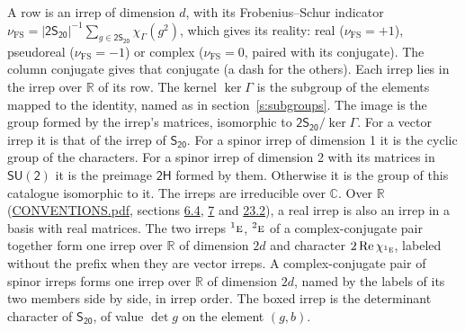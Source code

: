 \documentclass[10pt,a4paper]{article}
\numberwithin{equation}{section}
\newcommand{\grp}[1]{\mathsf{#1}}
\newcommand{\irr}[1]{\text{\normalfont\scshape #1}}
\newcommand{\conjpair}[1]{{}^{#1}}
\newcommand{\irchar}[1]{\chi_{#1}}
\newcommand{\fsind}{\nu_{\mathrm{FS}}}
\begin{document}
\leavevmode\label{n:index.frobenius}\label{n:head.irrep}\label{n:head.reality}A row is an irrep of dimension $d$, with its Frobenius--Schur indicator $\fsind = |\grp{2S_{20}}|^{-1}\allowbreak\sum_{g\in\grp{2S_{20}}}\irchar{\Gamma}(g^2)$, which gives its reality: real ($\fsind = +1$), pseudoreal ($\fsind = -1$) or complex ($\fsind = 0$, paired with its conjugate). \label{n:head.conjugate}The column conjugate gives that conjugate (a dash for the others). \label{n:head.over.real}Each irrep lies in the irrep over $\mathbb{R}$ of its row. \label{n:head.kernel}The kernel $\ker\Gamma$ is the subgroup of the elements mapped to the identity, named as in section~\ref{s:subgroups}. \label{n:head.image}The image is the group formed by the irrep's matrices, isomorphic to $\grp{2S_{20}}/\ker\Gamma$. For a vector irrep it is that of the irrep of \href{../../../rotation/data/pdf/S20.pdf}{$\grp{S_{20}}$}. For a spinor irrep of dimension 1 it is the cyclic group of the characters. For a spinor irrep of dimension 2 with its matrices in $\grp{SU(2)}$ it is the preimage $\grp{2H}$ formed by them. Otherwise it is the group of this catalogue isomorphic to it. The irreps are irreducible over $\mathbb{C}$. Over $\mathbb{R}$ (\href{../../CONVENTIONS.pdf}{CONVENTIONS.pdf}, sections \href{../../../rotation/CONVENTIONS.pdf\#conv.6.4}{6.4}, \href{../../../rotation/CONVENTIONS.pdf\#conv.7}{7} and \href{../../CONVENTIONS.pdf\#conv.23.2}{23.2}), a real irrep is also an irrep in a basis with real matrices. The two irreps $\conjpair{1}\irr{e}$, $\conjpair{2}\irr{e}$ of a complex-conjugate pair together form one irrep over $\mathbb{R}$ of dimension $2d$ and character $2\operatorname{Re}\irchar{\conjpair{1}\irr{e}}$, labeled without the prefix when they are vector irreps. A complex-conjugate pair of spinor irreps forms one irrep over $\mathbb{R}$ of dimension $2d$, named by the labels of its two members side by side, in irrep order. \label{n:mark.determinant}The boxed irrep is the determinant character of \href{../../../rotation/data/pdf/S20.pdf}{$\grp{S_{20}}$}, of value $\det g$ on the element $(g, b)$.
\setlength{\emergencystretch}{2em}\par\setlength{\emergencystretch}{0pt}
\end{document}
